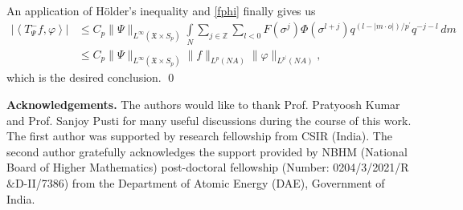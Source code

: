 \documentclass[12pt,reqno]{amsart}
\theoremstyle{definition}
\theoremstyle{definition}
\numberwithin{equation}{section}
\begin{document}
An application of H\"older's inequality and \eqref{fphi} finally gives us
\begin{align*}
|\left\langle T_{\Psi}^{-}f, \varphi\right\rangle| &\leq C_{p}\|\Psi\|_{L^{\infty}(\mathfrak{X}\times S_{p})} \int\limits_{N} \sum\limits_{j\in\mathbb{Z} } \sum\limits_{l<0}   F(\sigma^{j})  \varPhi(\sigma^{l+j})q^{(l-|m\cdot o|)/p^{\prime}}q^{-j-l}\,dm\\
&\leq C_{p}\|\Psi\|_{L^{\infty}(\mathfrak{X}\times S_{p})} \|f\|_{L^p(NA)} \|\varphi\|_{L^{p^{\prime}}(NA)},
\end{align*}
which is the desired conclusion. \qed



\textbf{Acknowledgements.}  The authors would like to thank Prof. Pratyoosh Kumar and Prof. Sanjoy Pusti for many useful discussions during the course of this work. The first author was supported by research fellowship from CSIR (India). The second author gratefully acknowledges the support provided by NBHM (National Board of Higher Mathematics) post-doctoral fellowship (Number: 0204/3/2021/R$\&$D-II/7386) from the Department of Atomic Energy (DAE), Government of India. 
	




\end{document}
